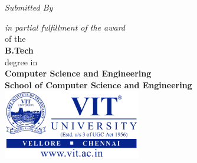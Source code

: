 
\begin{titlepage}

\begin{addmargin}[-1cm]{-3cm}
\begin{center}
\large

\hfill


\begingroup
\color{Maroon} \\ \bigskip %
\endgroup
\vfill
{} \\
\textit{Submitted By} \\

\vfill


\vfill
\textit{in partial fulfillment of the award} \\
of the \\
\textbf{B.Tech} \\
degree in\\
\textbf{Computer Science and Engineering} \\
\textbf{School of Computer Science and Engineering} \\
\vfill
\includegraphics[width=6cm]{gfx/logo} \\ \medskip %

\end{center}
\end{addmargin}

\end{titlepage}